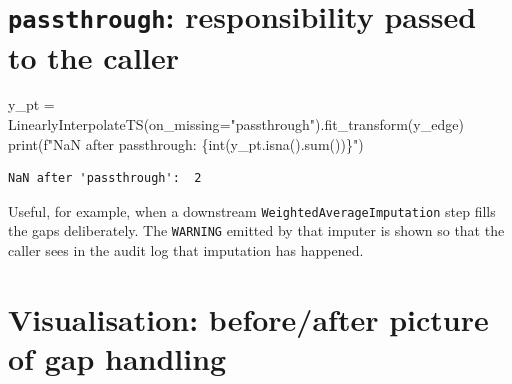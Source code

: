 \documentclass[
  english,
  letterpaper,
]{scrbook}
\newenvironment{Shaded}{\begin{snugshade}}{\end{snugshade}}
\newcommand{\BuiltInTok}[1]{\textcolor[rgb]{0.00,0.23,0.31}{#1}}
\newcommand{\NormalTok}[1]{\textcolor[rgb]{0.00,0.23,0.31}{#1}}
\newcommand{\OperatorTok}[1]{\textcolor[rgb]{0.37,0.37,0.37}{#1}}
\newcommand{\SpecialCharTok}[1]{\textcolor[rgb]{0.37,0.37,0.37}{#1}}
\newcommand{\SpecialStringTok}[1]{\textcolor[rgb]{0.13,0.47,0.30}{#1}}
\newcommand{\StringTok}[1]{\textcolor[rgb]{0.13,0.47,0.30}{#1}}
\begin{document}
\section{\texorpdfstring{\texttt{passthrough}: responsibility passed to
the
caller}{passthrough: responsibility passed to the caller}}\label{passthrough-responsibility-passed-to-the-caller}

\protect{}\label{cr3-passthrough}
\begin{Shaded}
\begin{Highlighting}[]
\NormalTok{y\_pt }\OperatorTok{=}\NormalTok{ LinearlyInterpolateTS(on\_missing}\OperatorTok{=}\StringTok{"passthrough"}\NormalTok{).fit\_transform(y\_edge)}
\BuiltInTok{print}\NormalTok{(}\SpecialStringTok{f"NaN after \textquotesingle{}passthrough\textquotesingle{}:  }\SpecialCharTok{\{}\BuiltInTok{int}\NormalTok{(y\_pt.isna().}\BuiltInTok{sum}\NormalTok{())}\SpecialCharTok{\}}\SpecialStringTok{"}\NormalTok{)}
\end{Highlighting}
\end{Shaded}

\begin{verbatim}
NaN after 'passthrough':  2
\end{verbatim}

Useful, for example, when a downstream
\texttt{WeightedAverageImputation} step fills the gaps deliberately. The
\texttt{WARNING} emitted by that imputer is shown so that the caller
sees in the audit log that imputation has happened.

\section{Visualisation: before/after picture of gap
handling}\label{visualisation-beforeafter-picture-of-gap-handling}
\end{document}
